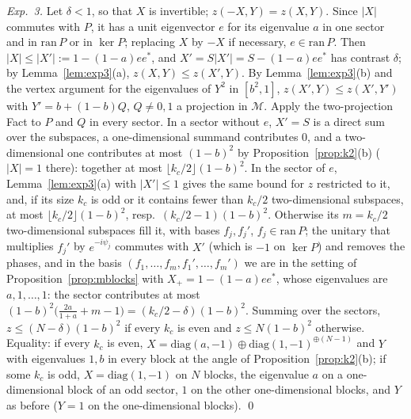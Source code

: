 \documentclass[11pt]{article}
\newcommand{\M}{\mathcal{M}}
\begin{document}
\emph{Exp.~3.} Let $\delta<1$, so that $X$ is invertible; $z(-X,Y)=z(X,Y)$. Since $|X|$ commutes with $P$, it has a
unit eigenvector $e$ for its eigenvalue $a$ in one sector and in $\mathrm{ran}\,P$ or in $\ker P$; replacing $X$ by
$-X$ if necessary, $e\in\mathrm{ran}\,P$. Then $|X|\le|X'|:=1-(1-a)ee^*$, and $X'=S|X'|=S-(1-a)ee^*$ has contrast $\delta$;
by Lemma~\ref{lem:exp3}(a), $z(X,Y)\le z(X',Y)$. By Lemma~\ref{lem:exp3}(b) and the vertex argument for the eigenvalues
of $Y^2$ in $[b^2,1]$, $z(X',Y)\le z(X',Y')$ with $Y'=b+(1-b)Q$, $Q\ne0,1$ a projection in $\M$. Apply
the two-projection Fact to $P$ and $Q$ in every sector. In a sector without $e$, $X'=S$ is a direct sum over the
subspaces, a one-dimensional summand contributes $0$, and a two-dimensional one contributes at most $(1-b)^2$ by
Proposition~\ref{prop:k2}(b) ($|X|=1$ there): together at most $\lfloor k_c/2\rfloor(1-b)^2$. In the sector of $e$,
Lemma~\ref{lem:exp3}(a) with $|X'|\le1$ gives the same bound for $z$ restricted to it, and, if its size $k_c$ is odd or
it contains fewer than $k_c/2$ two-dimensional subspaces, at most $\lfloor k_c/2\rfloor(1-b)^2$, resp.\
$(k_c/2-1)(1-b)^2$. Otherwise its $m=k_c/2$ two-dimensional subspaces fill it, with bases $f_j,f_j'$, $f_j\in\mathrm{ran}\,P$;
the unitary that multiplies $f_j'$ by $e^{-i\psi_j}$ commutes with $X'$ (which is $-1$ on $\ker P$) and removes the
phases, and in the basis $(f_1,\dots,f_m,f_1',\dots,f_m')$ we are in the setting of Proposition~\ref{prop:mblocks} with
$X_+=1-(1-a)ee^*$, whose eigenvalues are $a,1,\dots,1$: the sector contributes at most
$(1-b)^2\bigl(\frac{2a}{1+a}+m-1\bigr)=(k_c/2-\delta)(1-b)^2$. Summing over the sectors, $z\le(N-\delta)(1-b)^2$ if every $k_c$ is
even and $z\le N(1-b)^2$ otherwise. Equality: if every $k_c$ is even, $X=\mathrm{diag}(a,-1)\oplus\mathrm{diag}(1,-1)^{\oplus(N-1)}$
and $Y$ with eigenvalues $1,b$ in every block at the angle of Proposition~\ref{prop:k2}(b); if some $k_c$ is odd,
$X=\mathrm{diag}(1,-1)$ on $N$ blocks, the eigenvalue $a$ on a one-dimensional block of an odd sector, $1$ on the other
one-dimensional blocks, and $Y$ as before ($Y=1$ on the one-dimensional blocks). \qed


\end{document}
